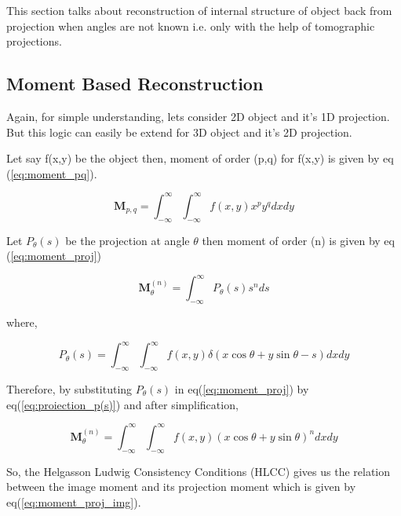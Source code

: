 \documentclass[twoside]{iitbreport}
\begin{document}
\noindent
This section talks about reconstruction of internal structure of object back from projection when angles are not known i.e. only with the help of tomographic projections.

\subsection{Moment Based Reconstruction}\label{subsec:recont_moment-based}
Again, for simple understanding, lets consider 2D object and it's 1D projection. But this logic can easily be extend for 3D object and it's 2D projection.

\noindent
Let say f(x,y) be the object then, moment of order (p,q) for f(x,y) is given by eq (\ref{eq:moment_pq}).

\begin{equation}\label{eq:moment_pq}
\boldsymbol{M}_{p,q} =   \int_{-\infty}^{\infty}  \int_{-\infty}^{\infty} f(x,y) x^py^q dxdy
\end{equation}

\noindent
Let $P_\theta(s)$ be the projection at angle $\theta$ then moment of order (n) is given by eq (\ref{eq:moment_proj})

\begin{equation}\label{eq:moment_proj}
\boldsymbol{M}_{\theta}^{(n)} =   \int_{-\infty}^{\infty} P_\theta(s) s^n ds
\end{equation}

where,

\begin{equation}\label{eq:proiection_p(s)}
P_\theta(s) =   \int_{-\infty}^{\infty} \int_{-\infty}^{\infty} f(x,y) \delta(x\cos\theta+y\sin\theta - s) dx dy
\end{equation}

\noindent
Therefore, by substituting $P_\theta(s)$ in eq(\ref{eq:moment_proj}) by eq(\ref{eq:proiection_p(s)}) and after simplification,

\begin{equation}
\boldsymbol{M}_{\theta}^{(n)} =   \int_{-\infty}^{\infty} \int_{-\infty}^{\infty} f(x,y) (x\cos\theta+y\sin\theta)^n dxdy
\end{equation}

\noindent
So, the Helgasson Ludwig Consistency Conditions (HLCC) \cite{malhotra2016tomographic} \cite{basu2000feasibility} \cite{natterer1986mathematics} gives us the relation between the image moment and its projection moment which is given by eq(\ref{eq:moment_proj_img}).
\end{document}
